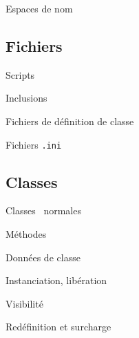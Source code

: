 \begin{frame}{Espaces de nom}

\end{frame}

\subsection{Fichiers}

\begin{frame}{Scripts}

\end{frame}

\begin{frame}{Inclusions}

\end{frame}

\begin{frame}{Fichiers de définition de classe}

\end{frame}

\begin{frame}{Fichiers \texttt{.ini}}

\end{frame}

\subsection{Classes}

\begin{frame}{Classes \guillemotleft~normales~\guillemotright}

\end{frame}

\begin{frame}{Méthodes}

\end{frame}

\begin{frame}{Données de classe}

\end{frame}

\begin{frame}{Instanciation, libération}

\end{frame}

\begin{frame}{Visibilité}

\end{frame}

\begin{frame}{Redéfinition et surcharge}

\end{frame}

